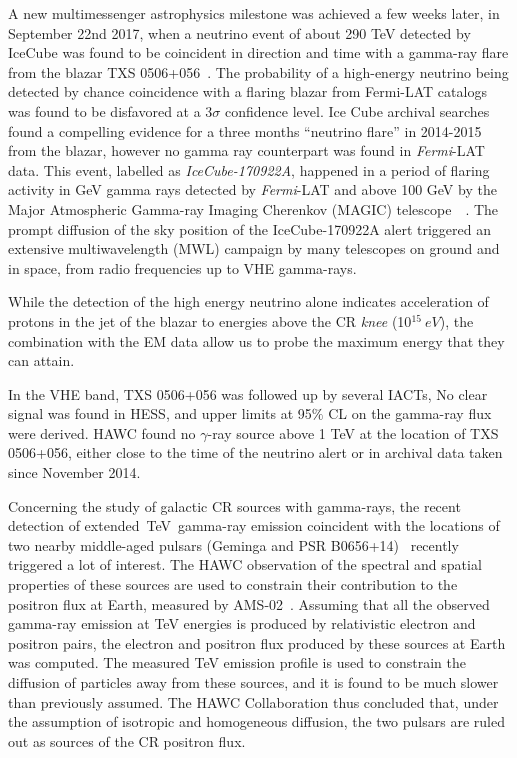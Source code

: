 \documentclass{PoS}
\begin{document}
A new multimessenger astrophysics milestone was achieved a few weeks later, in September 22nd 2017, when a  neutrino event of about 290 TeV detected by IceCube was found to be coincident in direction and time with a gamma-ray flare from the blazar TXS 0506+056~\cite{IceCube:2018dnn}.
The probability of a high-energy neutrino being detected by chance coincidence with a flaring blazar from Fermi-LAT catalogs was found to be disfavored at a 3$\sigma$ confidence level. Ice Cube archival searches  found a compelling evidence for a three months ``neutrino flare'' in 2014-2015 from the blazar, however no gamma ray  counterpart was found in \textit{Fermi}-LAT data. This event, labelled as \textit{IceCube-170922A}, happened in a period of flaring activity in GeV gamma rays detected by \textit{Fermi}-LAT and 
 above 100 GeV by the Major Atmospheric Gamma-ray Imaging Cherenkov (MAGIC) telescope~\cite{IceCube:2018cha}~\cite{MAGIC}.  The prompt diffusion of the sky position of the IceCube-170922A alert triggered an extensive multiwavelength (MWL) campaign by many telescopes on ground and in space, from radio frequencies up to VHE gamma-rays. 
 
While the detection of the high energy neutrino alone indicates acceleration of protons in the jet of the blazar to energies above the CR \textit{knee} (10$^{15}~eV$), the combination with the EM data allow us to probe the maximum energy that they can attain.

In the VHE band, TXS 0506+056 was followed up by several IACTs, 
No clear signal was found in HESS, and upper limits at 95$\%$ CL on the gamma-ray flux were derived. 
HAWC found no $\gamma$-ray source above 1 TeV at the location of TXS 0506+056, either close to the time of the neutrino alert or in archival data taken since November 2014.

Concerning the study of galactic CR sources with gamma-rays, the recent detection of extended~TeV~gamma-ray emission coincident with the 
locations of two nearby middle-aged pulsars (Geminga and PSR 
B0656+14)~\cite{HAWCpositrons} recently triggered a lot of interest. The HAWC observation of the spectral and spatial properties of these sources are used
to constrain their contribution to the positron flux at Earth, measured by AMS-02~\cite{positrons}. Assuming that all the observed gamma-ray emission at TeV energies is
produced by relativistic electron and positron pairs, the electron and positron
flux produced by these sources at Earth was computed. The measured TeV emission profile is used to constrain the diffusion of particles away from these
sources, and it is found to be much slower than previously assumed. The HAWC Collaboration thus concluded that, under the assumption of isotropic and homogeneous diffusion, the two pulsars are ruled out as sources of the CR positron flux.
\end{document}
